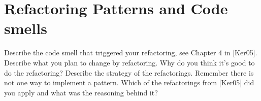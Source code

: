 \section{Refactoring Patterns and Code smells}
Describe the code smell that triggered your refactoring, see Chapter 4 in [Ker05].
Describe what you plan to change by refactoring.
Why do you think it's good to do the refactoring?
Describe the strategy of the refactorings. Remember there is not one way to implement a pattern.
Which of the refactorings from [Ker05] did you apply and what was the reasoning behind it?
